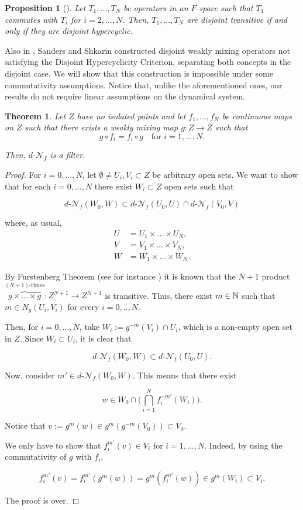 \documentclass[11pt,reqno]{article}
\newtheorem{theorem}[statement]{Theorem}
\newtheorem{proposition}[statement]{Proposition}
\def\dret{d\text{-}\ret}
\def\ret{\mathcal{N}}
\def\NN{\Bbb N}
\begin{document}
\begin{proposition}[{\cite[Proposition 2.4]{Car24}}]
    Let $T_1,...,T_N$ be operators in an $F$-space such that $T_1$ commutes with $T_i$ for $i=2,...,N$. Then, $T_1,...,T_N$ are disjoint transitive if and only if they are disjoint hypercyclic.
\end{proposition}


Also in \cite{SanShk14}, Sanders and Shkarin constructed disjoint weakly mixing operators not satisfying the Disjoint Hypercyclicity Criterion, separating both concepts in the disjoint case. We will show that this construction is impossible under some commutativity assumptions. Notice that, unlike the aforementioned ones, our results do not require linear assumptions on the dynamical system.

\begin{theorem}\label{thm:comm-filter}
     Let $Z$ have no isolated points and let $f_1,...,f_N$ be continuous maps on $Z$ such that there exists a weakly mixing map $g\colon Z\to Z$ such that 
     \[g\circ f_i = f_i \circ g \quad \text{for } i=1,...,N.\]

     Then, $\dret_f$ is a filter.
\end{theorem}

\begin{proof}
    For $i=0,...,N$, let $\emptyset \neq U_i, V_i \subset Z$ be arbitrary open sets. We want to show that for each $i=0,...,N$ there exist $W_i\subset Z$ open sets such that

    \[\dret_f(W_0,W)\subset \dret_f(U_0,U) \cap \dret_f(V_0,V)\]

    where, as usual, 
    \begin{align*}
        U&=U_1\times...\times U_N, \\
         V&=V_1\times...\times V_N, \\
          W&=W_1\times...\times W_N.
    \end{align*}

    By Furstenberg Theorem (see for instance \cite[Theorem 1.51]{GEPe10}) it is known that the $N+1$ product $ \overbrace{g\times...\times g}^{(N+1)\text{-times}}\colon Z^{N+1}\to Z^{N+1} $ is transitive. 
Thus, there exist $m\in \NN$ such that $m\in N_g(U_i,V_i)$ for every $i=0,..,N$. 

Then, for $i=0,...,N$, take $W_i:=g^{-m}(V_i) \cap U_i$, which is a non-empty open set in $Z$. Since $W_i\subset U_i$, it is clear that 

\[\dret_f(W_0,W) \subset \dret_f(U_0,U).\]


Now, consider $m'\in \dret_f(W_0,W)$. This means that there exist

\[w\in W_0 \cap \Big( \bigcap_{i=1}^N f_i^{-m'}(W_i) \Big)%
.\]

Notice that $v:= g^m(w)\in g^m(g^{-m}(V_0))\subset V_0$.

We only have to show that $f_i^{m'}(v)\in V_i$ for $i=1,..., N$. Indeed, by using the commutativity of $g$ with $f_i$, 

\[f_i^{m'}(v) = f_i^{m'}(g^m(w))= g^m(f_i^{m'}(w))\in g^m(W_i) \subset V_i.\]

The proof is over.
\end{proof}
\end{document}

